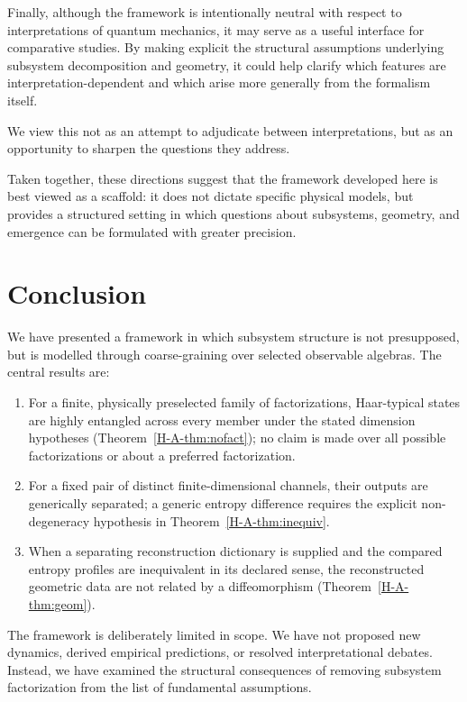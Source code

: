 \documentclass[12pt,a4paper,openany]{book}
\begin{document}
Finally, although the framework is intentionally neutral with respect to interpretations of quantum mechanics, it may serve as a useful interface for comparative studies. 
By making explicit the structural assumptions underlying subsystem decomposition and geometry, it could help clarify which features are interpretation-dependent and which arise more generally from the formalism itself.

We view this not as an attempt to adjudicate between interpretations, but as an opportunity to sharpen the questions they address.

\medskip

Taken together, these directions suggest that the framework developed here is best viewed as a scaffold: it does not dictate specific physical models, but provides a structured setting in which questions about subsystems, geometry, and emergence can be formulated with greater precision.

\section{Conclusion}
\label{H-A-sec:conclusion}

We have presented a framework in which subsystem structure is not presupposed, but is modelled through coarse-graining over selected observable algebras. 
The central results are:

\begin{enumerate}
\item For a finite, physically preselected family of factorizations, Haar-typical states are highly entangled across every member under the stated dimension hypotheses (Theorem~\ref{H-A-thm:nofact}); no claim is made over all possible factorizations or about a preferred factorization.
\item For a fixed pair of distinct finite-dimensional channels, their outputs are generically separated; a generic entropy difference requires the explicit non-degeneracy hypothesis in Theorem~\ref{H-A-thm:inequiv}.
\item When a separating reconstruction dictionary is supplied and the compared entropy profiles are inequivalent in its declared sense, the reconstructed geometric data are not related by a diffeomorphism (Theorem~\ref{H-A-thm:geom}).
\end{enumerate}

The framework is deliberately limited in scope. 
We have not proposed new dynamics, derived empirical predictions, or resolved interpretational debates. 
Instead, we have examined the structural consequences of removing subsystem factorization from the list of fundamental assumptions.
\end{document}
